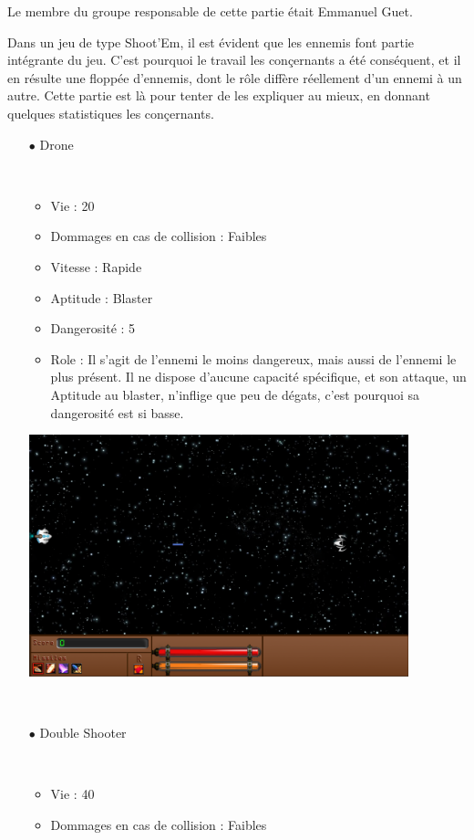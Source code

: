 \par Le membre du groupe responsable de cette partie était Emmanuel Guet.

Dans un jeu de type Shoot'Em, il est évident que les ennemis font partie intégrante du jeu.
C'est pourquoi le travail les conçernants a été conséquent, et il en résulte une floppée d'ennemis, dont le rôle diffère réellement d'un ennemi à un autre. Cette partie est là pour tenter de les expliquer au mieux, en donnant quelques statistiques les conçernants.

		\begin{itemize}
			\item[$\bullet$ Drone]
				\par~
				\begin{itemize}
					\item Vie : 20
					\item Dommages en cas de collision : Faibles
					\item Vitesse : Rapide
					\item Aptitude : Blaster
					\item Dangerosité : 5%
					\item Role : Il s'agit de l'ennemi le moins dangereux, mais aussi de l'ennemi le plus présent. Il ne dispose d'aucune capacité spécifique, et son attaque, un Aptitude au blaster, n'inflige que peu de dégats, c'est pourquoi sa dangerosité est si basse.
				\end{itemize}
\includegraphics[width=11cm]{images/vaisseaux/drone.png}
				\par~
			\item[$\bullet$ Double Shooter]
				\par~
				\begin{itemize}
					\item Vie : 40
					\item Dommages en cas de collision : Faibles

\end{itemize}
\end{itemize}
